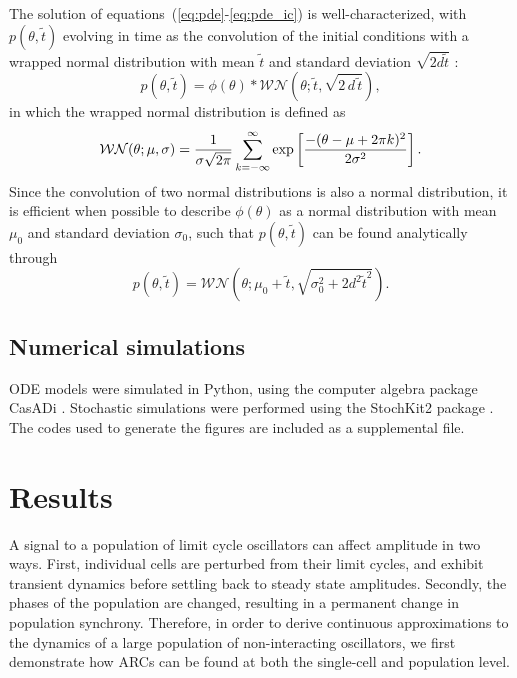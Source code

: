The solution of equations~(\ref{eq:pde}-\ref{eq:pde_ic}) is well-characterized, with $p(\theta, \tilde{t})$ evolving in time as the convolution of the initial conditions with a wrapped normal distribution with mean $\tilde{t}$ and standard deviation $\sqrt{2d\tilde{t}}$ \cite{Chirikjian2009}:
\begin{equation}
  p(\theta, \tilde{t}) = \phi(\theta) * \mathcal{WN}(\theta; \tilde{t},
  \sqrt{2\, d\, \tilde{t}}),
\end{equation}
in which the wrapped normal distribution \cite{Mardia2009} is defined as
\begin{equation}
  {\cal WN}(\theta; \mu, \sigma) =
  \frac{1}{\sigma\sqrt{2\pi}}\sum_{k=-\infty}^\infty \exp\left[\frac{-(\theta
  - \mu + 2\pi k)^2}{2\sigma^2}\right].
  \label{eq:wrapped_normal}
\end{equation}
Since the convolution of two normal distributions is also a normal distribution, it is efficient when possible to describe $\phi(\theta)$ as a normal distribution with mean $\mu_0$ and standard deviation $\sigma_0$, such that $p(\theta, \tilde{t})$ can be found analytically through
\begin{equation}
  p(\theta, \tilde{t}) = \mathcal{WN}(\theta; \mu_0 + \tilde{t},
  \sqrt{\sigma_0^2 + 2d^2\tilde{t}^2}).
\end{equation}

\subsection{Numerical simulations}

ODE models were simulated in Python, using the computer algebra package CasADi \cite{Andersson2013b}.
Stochastic simulations were performed using the StochKit2 package \cite{Sanft2011a}.
The codes used to generate the figures are included as a supplemental file.

\section{Results}

A signal to a population of limit cycle oscillators can affect amplitude in two ways.
First, individual cells are perturbed from their limit cycles, and exhibit transient dynamics before settling back to steady state amplitudes.
Secondly, the phases of the population are changed, resulting in a permanent change in population synchrony.
Therefore, in order to derive continuous approximations to the dynamics of a large population of non-interacting oscillators, we first demonstrate how ARCs can be found at both the single-cell and population level.

